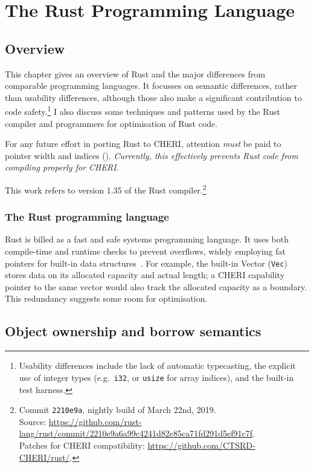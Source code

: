 \documentclass[dissertation.tex]{subfiles}
\begin{document}
\chapter{The Rust Programming Language}
\label{ch:rust}

\section{Overview}
This chapter gives an overview of Rust and the major differences from
comparable programming languages.
It focusses on semantic differences, rather than usability differences,
although those also make a significant contribution to code
safety.\footnote{Usability differences include the lack of automatic
typecasting, the explicit use of integer types (e.g.\ \texttt{i32}, or
\texttt{usize} for array indices), and the built-in test harness.}
I also discuss some techniques and patterns used by the Rust compiler
and programmers for optimisation of Rust code.

For any future effort in porting Rust to CHERI, attention \emph{must} be
paid to pointer width and indices ().
\emph{Currently, this effectively prevents Rust code from compiling
properly for CHERI.}

This work refers to version 1.35 of the Rust
compiler.\footnote{Commit \texttt{2210e9a}, nightly build of March 22nd,
2019. \\ Source:
\url{https://github.com/rust-lang/rust/commit/2210e9a6a99c4241d82e85ca71fd291d5ef91c7f}.
\\ Patches for CHERI compatibility: \url{https://github.com/CTSRD-CHERI/rust/}.}


\subsection{The Rust programming language}
Rust is billed as a fast and safe systems programming language.
It uses both compile-time and runtime checks to prevent overflows,
widely employing fat pointers for built-in data
structures~\cite{blandy-orendorff}.
For example, the built-in Vector (\texttt{Vec}) stores data on its
allocated capacity and actual length; a CHERI capability pointer to the
same vector would also track the allocated capacity as a boundary.
This redundancy suggests some room for optimisation.


\section{Object ownership and borrow semantics}
\label{sec:rust-borrow}
\end{document}
